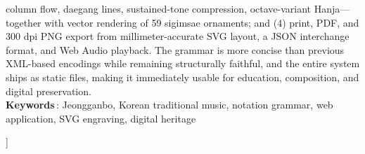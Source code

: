 \documentclass[twocolumn,10pt]{article}
\begin{document}
{\begin{center}
\begin{minipage}{0.92\textwidth}
column flow, daegang lines, sustained-tone compression, octave-variant Hanja---
together with vector rendering of 59 sigimsae ornaments; and (4) print, PDF,
and 300 dpi PNG export from millimeter-accurate SVG layout, a JSON interchange
format, and Web Audio playback. The grammar is more concise than previous
XML-based encodings while remaining structurally faithful, and the entire
system ships as static files, making it immediately usable for education,
composition, and digital preservation.
\\[2pt]
\textbf{Keywords}\,: Jeongganbo, Korean traditional music, notation grammar,
web application, SVG engraving, digital heritage
\end{minipage}
\end{center}
\vspace{1.5em}
}]







\end{document}
